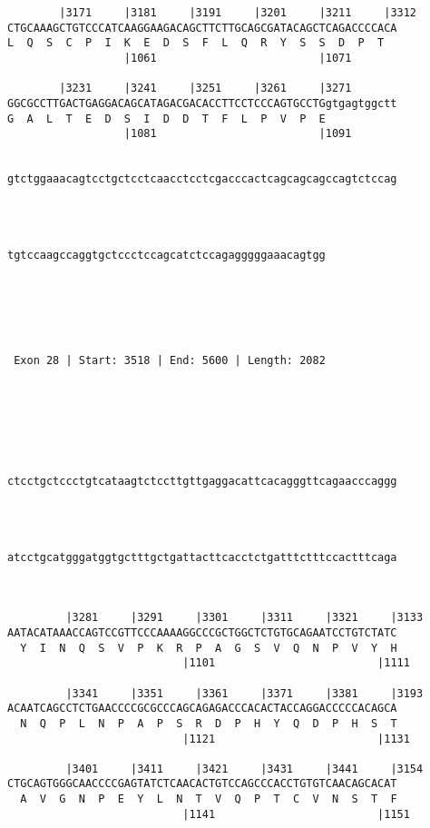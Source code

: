 \documentclass{article}
\begin{document}
\begin{Verbatim}
        |3171     |3181     |3191     |3201     |3211     |3312
CTGCAAAGCTGTCCCATCAAGGAAGACAGCTTCTTGCAGCGATACAGCTCAGACCCCACA
L  Q  S  C  P  I  K  E  D  S  F  L  Q  R  Y  S  S  D  P  T  
                  |1061                         |1071       
   
        |3231     |3241     |3251     |3261     |3271       
GGCGCCTTGACTGAGGACAGCATAGACGACACCTTCCTCCCAGTGCCTGgtgagtggctt
G  A  L  T  E  D  S  I  D  D  T  F  L  P  V  P  E           
                  |1081                         |1091
   
                                                            
gtctggaaacagtcctgctcctcaacctcctcgacccactcagcagcagccagtctccag
                                                            

   
                                                 
tgtccaagccaggtgctccctccagcatctccagagggggaaacagtgg
                                                 

  



 Exon 28 | Start: 3518 | End: 5600 | Length: 2082 





   
                                                            
ctcctgctccctgtcataagtctccttgttgaggacattcacagggttcagaacccaggg
                                                            

   
                                                            
atcctgcatgggatggtgctttgctgattacttcacctctgatttctttccactttcaga
                                                            

   
         |3281     |3291     |3301     |3311     |3321     |3133
AATACATAAACCAGTCCGTTCCCAAAAGGCCCGCTGGCTCTGTGCAGAATCCTGTCTATC
  Y  I  N  Q  S  V  P  K  R  P  A  G  S  V  Q  N  P  V  Y  H
                           |1101                         |1111
   
         |3341     |3351     |3361     |3371     |3381     |3193
ACAATCAGCCTCTGAACCCCGCGCCCAGCAGAGACCCACACTACCAGGACCCCCACAGCA
  N  Q  P  L  N  P  A  P  S  R  D  P  H  Y  Q  D  P  H  S  T
                           |1121                         |1131
   
         |3401     |3411     |3421     |3431     |3441     |3154
CTGCAGTGGGCAACCCCGAGTATCTCAACACTGTCCAGCCCACCTGTGTCAACAGCACAT
  A  V  G  N  P  E  Y  L  N  T  V  Q  P  T  C  V  N  S  T  F
                           |1141                         |1151
   

\end{Verbatim}
\end{document}
